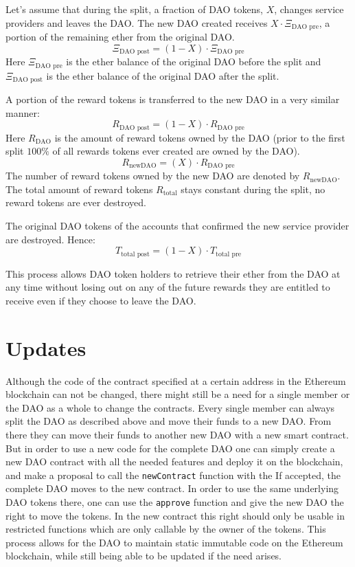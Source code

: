 \documentclass[9pt,oneside]{amsart}
\begin{document}
\begin{multicols}{2}
Let’s assume that during the split, a fraction of DAO tokens, $X$, changes service providers and leaves the DAO. The new DAO created receives $X \cdot \Xi_{\text{DAO pre}}$, a portion of the remaining ether from the original DAO.
\begin{equation}
 \Xi_{\text{DAO post}} = (1 - X) \cdot \Xi_{\text{DAO pre}}
\end{equation}
Here $\Xi_{\text{DAO pre}}$ is the ether balance of the original DAO before the split and $\Xi_{\text{DAO post}}$ is the ether balance of the original DAO after the split.

A portion of the reward tokens is transferred to the new DAO in a very similar manner:
\begin{equation}
 R_{\text{DAO post}} = (1 - X) \cdot R_{\text{DAO pre}}
\end{equation}
Here $R_{\text{DAO}}$ is the amount of reward tokens owned by the DAO (prior to the first split $100\%$ of all rewards tokens ever created are owned by the DAO).
\begin{equation}
 R_{\text{newDAO}} = (X) \cdot R_{\text{DAO pre}}
\end{equation}
The number of reward tokens owned by the new DAO are denoted by $R_{\text{newDAO}}$.
The total amount of reward tokens $R_{\text{total}}$ stays constant during the split, no reward tokens are ever destroyed.

The original DAO tokens of the accounts that confirmed the new service provider are destroyed.
Hence:
\begin{equation}
 T_{\text{total post}}= (1 - X) \cdot T_{\text{total pre}}
\end{equation}

This process allows DAO token holders to retrieve their ether from the DAO at any time without losing out on any of the future rewards they are entitled to receive even if they choose to leave the DAO.

\section{Updates}
Although the code of the contract specified at a certain address in the Ethereum blockchain can not be changed, there might still be a need for a single member or the DAO as a whole to change the contracts.
Every single member can always split the DAO as described above and move their funds to a new DAO. From there they can move their funds to another new DAO with a new smart contract.
But in order to use a new code for the complete DAO one can simply create a new DAO contract with all the needed features and deploy it on the blockchain, and make a proposal to call the \verb|newContract| function with the 
If accepted, the complete DAO moves to the new contract. In order to use the same underlying DAO tokens there, one can use the \verb|approve| function and give the new DAO the right to move the tokens. In the new contract this right should only be usable in restricted functions which are only callable by the owner of the tokens. This process allows for the DAO to maintain static immutable code on the Ethereum blockchain, while still being able to be updated if the need arises.


\end{multicols}
\end{document}
